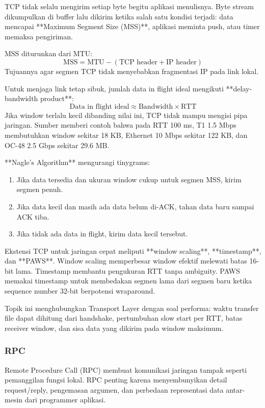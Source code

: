 TCP tidak selalu mengirim setiap byte begitu aplikasi menulisnya. Byte stream dikumpulkan di buffer lalu dikirim ketika salah satu kondisi terjadi: data mencapai **Maximum Segment Size (MSS)**, aplikasi meminta push, atau timer memaksa pengiriman.

MSS diturunkan dari MTU:
\[
    \text{MSS} = \text{MTU} - (\text{TCP header} + \text{IP header})
\]
Tujuannya agar segmen TCP tidak menyebabkan fragmentasi IP pada link lokal.

Untuk menjaga link tetap sibuk, jumlah data in flight ideal mengikuti **delay-bandwidth product**:
\[
    \text{Data in flight ideal} \approx \text{Bandwidth} \times \text{RTT}
\]
Jika window terlalu kecil dibanding nilai ini, TCP tidak mampu mengisi pipa jaringan. Sumber memberi contoh bahwa pada RTT 100 ms, T1 1.5 Mbps membutuhkan window sekitar 18 KB, Ethernet 10 Mbps sekitar 122 KB, dan OC-48 2.5 Gbps sekitar 29.6 MB.

**Nagle's Algorithm** mengurangi tinygrams:
\begin{enumerate}
    \item Jika data tersedia dan ukuran window cukup untuk segmen MSS, kirim segmen penuh.
    \item Jika data kecil dan masih ada data belum di-ACK, tahan data baru sampai ACK tiba.
    \item Jika tidak ada data in flight, kirim data kecil tersebut.
\end{enumerate}

Ekstensi TCP untuk jaringan cepat meliputi **window scaling**, **timestamp**, dan **PAWS**. Window scaling memperbesar window efektif melewati batas 16-bit lama. Timestamp membantu pengukuran RTT tanpa ambiguity. PAWS memakai timestamp untuk membedakan segmen lama dari segmen baru ketika sequence number 32-bit berpotensi wraparound.

Topik ini menghubungkan Transport Layer dengan soal performa: waktu transfer file dapat dihitung dari handshake, pertumbuhan slow start per RTT, batas receiver window, dan sisa data yang dikirim pada window maksimum.

\subsubsection{RPC}
\begin{jawab}
Remote Procedure Call (RPC) membuat komunikasi jaringan tampak seperti pemanggilan fungsi lokal. RPC penting karena menyembunyikan detail request/reply, pengemasan argumen, dan perbedaan representasi data antar-mesin dari programmer aplikasi.
\end{jawab}

